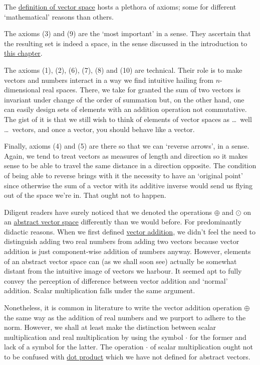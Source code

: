 \begin{remark}{}{}
 The \hyperref[def:abstract-vector-space]{definition of vector space} hosts a
 plethora of axioms; some for different `mathematical' reasons than others.

 The axioms (3) and (9) are the `most important' in a sense. They ascertain that
 the resulting set is indeed a space, in the sense discussed in the introduction
 to \hyperref[chap:abstract-vector-spaces]{this chapter}.

 The axioms (1), (2), (6), (7), (8) and (10) are technical. Their role is to
 make vectors and numbers interact in a way we find intuitive hailing from
 $n$-dimensional real spaces. There, we take for granted the sum of two vectors
 is invariant under change of the order of summation but, on the other hand, one
 can easily design sets of elements with an addition operation not commutative.
 The gist of it is that we still wish to think of elements of vector spaces as
 \dots~well \dots~vectors, and once a vector, you should behave like a vector.

 Finally, axioms (4) and (5) are there so that we can `reverse arrows', in a
 sense. Again, we tend to treat vectors as measures of length and direction so
 it makes sense to be able to travel the same distance in a direction opposite.
 The condition of being able to reverse brings with it the necessity to have an
 `original point' since otherwise the sum of a vector with its additive inverse
 would send us flying out of the space we're in. That ought not to happen.
\end{remark}

\begin{remark}{}{}
 Diligent readers have surely noticed that we denoted the operations $ \oplus $
 and $\odot$ on an \hyperref[def:abstract-vector-space]{abstract vector space}
 differently than we would before. For predominantly didactic reasons. When we
 first defined \hyperref[def:adding-vectors]{vector addition}, we didn't feel
 the need to distinguish adding two real numbers from adding two vectors because
 vector addition is just component-wise addition of numbers anyway. However,
 elements of an abstract vector space can (as we shall soon see) actually be
 somewhat distant from the intuitive image of vectors we harbour. It seemed apt
 to fully convey the perception of difference between vector addition and
 `normal' addition. Scalar multiplication falls under the same argument.

 Nonetheless, it is common in literature to write the vector addition operation
 $ \oplus $ the same way as the addition of real numbers and we purport to
 adhere to the norm. However, we shall at least make the distinction between
 scalar multiplication and real multiplication by using the symbol $ \cdot $ for
 the former and lack of a symbol for the latter. The operation $ \cdot $ of
 scalar multiplication ought not to be confused with
 \hyperref[def:dot-product]{dot product} which we have not defined for abstract
 vectors.
\end{remark}

